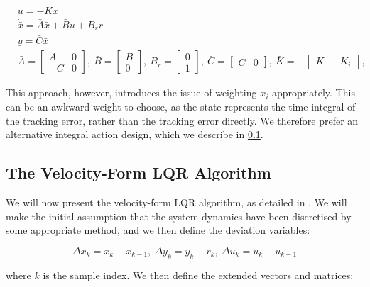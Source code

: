 \begin{align}\label{eq:ClassicalIntegralAction}
&u = -\bar{K}\bar{x} \\
&\dot{\bar{x}} = \bar{A}\bar{x} + \bar{B}u + B_r r \\ 
&y = \bar{C}\bar{x} \\
&\bar{A} = \begin{bmatrix}A & 0 \\ -C & 0 \end{bmatrix}, \ \bar{B} = \begin{bmatrix} B \\ 0 \end{bmatrix}, \ B_r = \begin{bmatrix} 0 \\ 1 \end{bmatrix}, \ \bar{C} = \begin{bmatrix} C & 0 \end{bmatrix},
\ \bar{K} = -\begin{bmatrix} K & -K_i \end{bmatrix},
\end{align}

This approach, however, introduces the issue of weighting $x_i$ appropriately. This can be an awkward weight to choose, as the state represents the time integral of the tracking error, rather than the tracking error directly. We therefore prefer an alternative integral action design, which we describe in \cref{subsec:VelocityFormLQR}.

\subsection{The Velocity-Form LQR Algorithm}\label{subsec:VelocityFormLQR}

We will now present the velocity-form LQR algorithm, as detailed in \cite{Pannocchia2001,Ruscio2012}. We will make the initial assumption that the system dynamics have been discretised by some appropriate method, and we then define the deviation variables:

\begin{equation}\label{eq:VelocityVariables}
	\Delta x_k = x_k - x_{k-1}, \ \Delta y_k = y_k - r_k, \ \Delta u_k = u_k-u_{k-1}
\end{equation}

where $k$ is the sample index. We then define the extended vectors and matrices:


